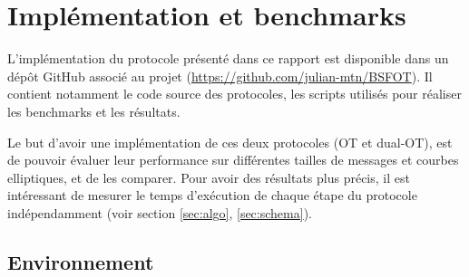 \documentclass[10pt,a4paper]{article}
\theoremstyle{definition}
\theoremstyle{plain}
\theoremstyle{remark}
\begin{document}
\section{Implémentation et benchmarks}

L'implémentation du protocole présenté dans ce rapport est disponible dans un
dépôt GitHub associé au projet (\url{https://github.com/julian-mtn/BSFOT}). Il contient notamment le code source des
protocoles, les scripts utilisés pour réaliser les benchmarks et les résultats.

Le but d'avoir une implémentation de ces deux protocoles (OT et dual-OT), 
est de pouvoir évaluer leur performance sur différentes tailles de messages et courbes elliptiques,
et de les comparer.
Pour avoir des résultats plus précis, il est intéressant de mesurer le temps d'exécution de chaque étape du protocole indépendamment (voir section \ref{sec:algo}, \ref{sec:schema}).

\subsection{Environnement}
\end{document}
